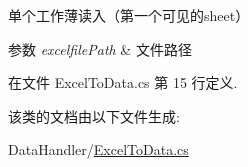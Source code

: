 单个工作薄读入（第一个可见的sheet） 
\begin{DoxyParams}{参数}
{\em excelfile\-Path} & 文件路径\\
\hline
\end{DoxyParams}




在文件 Excel\-To\-Data.\-cs 第 15 行定义.



该类的文档由以下文件生成\-:\begin{DoxyCompactItemize}
\item 
Data\-Handler/\hyperlink{_excel_to_data_8cs}{Excel\-To\-Data.\-cs}\end{DoxyCompactItemize}
